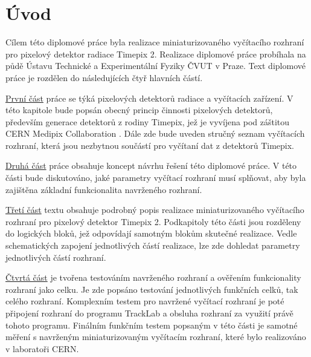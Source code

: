 \chapter{Úvod}



Cílem této diplomové práce byla realizace miniaturizovaného vyčítacího rozhraní pro pixelový detektor radiace Timepix 2. Realizace diplomové práce probíhala na půdě Ústavu Technické a Experimentální Fyziky ČVUT v Praze. Text diplomové práce je rozdělen do následujících čtyř hlavních částí.

\par \hyperref[kap:2]{První část} práce se týká pixelových detektorů radiace a vyčítacích zařízení. V této kapitole bude popsán obecný princip činnosti pixelových detektorů, především generace detektorů z rodiny Timepix, jež je vyvíjena pod záštitou CERN Medipix Collaboration \cite{Medpix}. Dále zde bude uveden stručný seznam vyčítacích rozhraní, která jsou nezbytnou součástí pro vyčítaní dat z detektorů Timepix.

\par \hyperref[Koncept reseni]{Druhá část} práce obsahuje koncept návrhu řešení této diplomové práce. V této části bude diskutováno, jaké parametry vyčítací rozhraní musí splňovat, aby byla zajištěna základní funkcionalita navrženého rozhraní.

\par \hyperref[realizace]{Třetí část} textu obsahuje podrobný popis realizace miniaturizovaného vyčítacího rozhraní pro pixelový detektor Timepix 2. Podkapitoly této části jsou rozděleny do logických bloků, jež odpovídají samotným blokům skutečné realizace. Vedle schematických zapojení jednotlivých částí realizace, lze zde dohledat parametry jednotlivých částí rozhraní.

\par \hyperref[testovani]{Čtvrtá část} je tvořena testováním navrženého rozhraní a ověřením funkcionality rozhraní jako celku. Je zde popsáno testování jednotlivých funkčních celků, tak celého rozhraní. Komplexním testem pro navržené vyčítací rozhraní je poté připojení rozhraní do programu TrackLab \cite{Manek_2024} a obsluha rozhraní za využití právě tohoto programu. Finálním funkčním testem popsaným v této části je samotné měření s navrženým miniaturizovaným vyčítacím rozhraní, které bylo realizováno v laboratoři CERN.